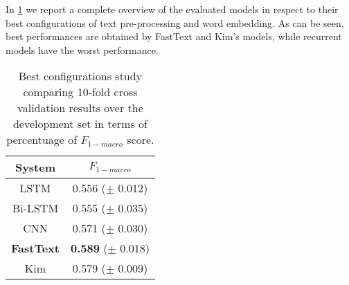 \begin{comment}
\begin{table}[h]
\footnotesize
\caption{Text representation study comparing 10-fold cross validation results over the development set in terms of percentuage of $F_{1-macro}$ score. The pre-processing setting was fixed at RM+EM.}
\centering
\begin{tabular}{l|ccccc}
\toprule
\multirow{2}{*}{Embedding}	& \multicolumn{5}{ c }{Models}       \\ 
& CNN		& LSTM		& B-LSTM	& FAST-TEXT	& KIM	\\ 
\hline 
ES static			& \textbf{48,1}		& 36,1		& 38,9		& 36,4		& 43,6\\
CA static			& \textbf{45,1}		& 30,6		& 38,5		& 30,1		& 39,6\\ 
\hline
ES non-static		& \win57,1		& 52,1		& 49,9		& \win54,8		& \win\textbf{58,9}\\
CA non-static		& 53,5		& \win53,6		& 46,3		& 54,1		& \textbf{56,2}\\
\hline
non-static			& 52,6		& 47,3		& \win51,8		& 53,3		& \textbf{54,7}\\
\bottomrule
\end{tabular}
\end{table}
\end{comment}

In \cref{tab:overview} we report a complete overview of the evaluated models in respect to their best configurations of text pre-processing and word embedding. As can be seen, best performances are obtained by FastText and Kim's models, while recurrent models have the worst performance.

\begin{table}[h]
	\footnotesize
	\caption{Best configurations study comparing 10-fold cross validation results over the development set in terms of percentuage of $F_{1-macro}$ score. }
	\label{tab:overview}
	\centering
	\begin{tabular}{c|c}
		\toprule
		\hline
		System		& $F_{1-macro}$		\\
		\hline
		LSTM		& 0.556 ($\pm$ 0.012) \\
		Bi-LSTM		& 0.555 ($\pm$ 0.035) \\
		CNN			& 0.571 ($\pm$ 0.030) \\
		\textbf{FastText}	& \textbf{0.589} ($\pm$ 0.018) \\
		Kim			& 0.579 ($\pm$ 0.009) \\
		\hline
		\bottomrule
	\end{tabular}
\end{table}


